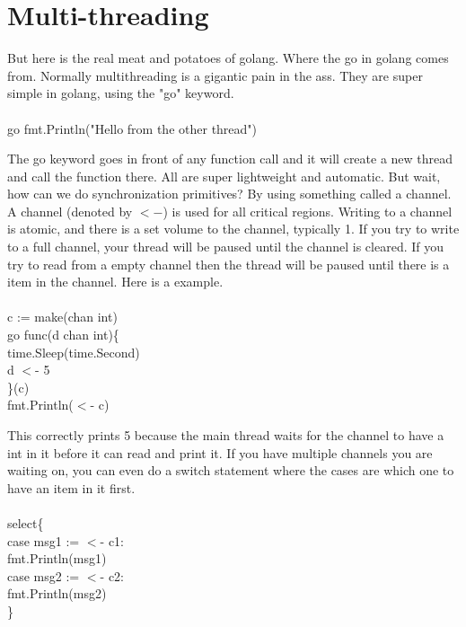 \documentclass[12pt]{article}
\newcommand{\quest}[1]{\textcolor{dank}{#1}}
\newcommand{\ta}[0]{\hspace*{5mm}}
\begin{document}
\section{Multi-threading}
But here is the real meat and potatoes of golang. Where the go in golang comes from. Normally multithreading is a gigantic pain in the ass. They are super simple in golang, using the "go" keyword.\\\\
\quest{
go fmt.Println("Hello from the other thread")\\
}
\par The go keyword goes in front of any function call and it will create a new thread and call the function there. All are super lightweight and automatic. But wait, how can we do synchronization primitives? By using something called a channel. A channel (denoted by $<-$) is used for all critical regions. Writing to a channel is atomic, and there is a set volume to the channel, typically 1. If you try to write to a full channel, your thread will be paused until the channel is cleared. If you try to read from a empty channel then the thread will be paused until there is a item in the channel. Here is a example. \\\\
\quest{
c := make(chan int)\\
go func(d chan int)\{\\
\ta time.Sleep(time.Second)\\
\ta d $<$- 5 \\
\}(c)\\
fmt.Println($<$- c)\\
}
\par This correctly prints 5 because the main thread waits for the  channel to have a int in it before it can read and print it. If you have multiple channels you are waiting on, you can even do a switch statement where the cases are which one to have an item in it first. \\\\
\quest{
select\{\\
\ta case msg1 := $<$- c1:\\
\ta \ta fmt.Println(msg1)\\
\ta case msg2 := $<$- c2: \\
\ta \ta fmt.Println(msg2)\\
\}\\
}
\end{document}
